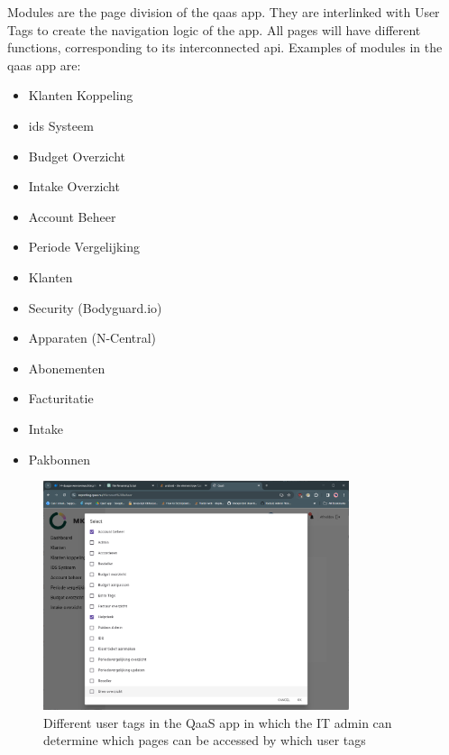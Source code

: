 \begin{multicols}{2}
      Modules are the page division of the \acrshort{qaas} app. They are interlinked with User Tags to create the navigation logic of the app.
      All pages will have different functions, corresponding to its interconnected \acrshort{api}. Examples of modules in the \acrshort{qaas} app
      are:

      \begin{itemize}
            \item Klanten Koppeling
            \item \acrshort{ids} Systeem
            \item Budget Overzicht
            \item Intake Overzicht
            \item Account Beheer
            \item Periode Vergelijking
            \item Klanten
            \item Security (Bodyguard.io)
            \item Apparaten (N-Central)
            \item Abonementen
            \item Facturitatie
            \item Intake
            \item Pakbonnen
      \end{itemize}

\end{multicols}

\begin{figure}[htbp]
      \centering
      \includegraphics[width=0.8\textwidth]{Figures/Qaas App/Modules/afbeelding (1).png}
      \caption{Different user tags in the QaaS app in which the IT admin can determine which pages can be accessed by which user tags}
      \label{fig:qaasAppModules}
\end{figure}

